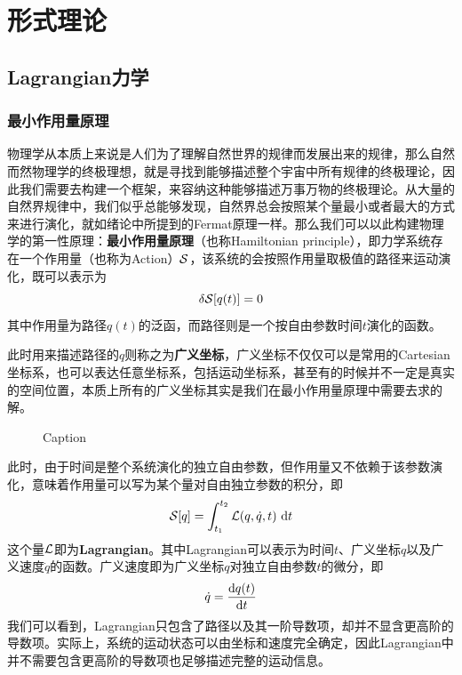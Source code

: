 \part{形式理论}
\chapter{Lagrangian力学}
\section{最小作用量原理}
\label{sec:princ_least_action}
物理学从本质上来说是人们为了理解自然世界的规律而发展出来的规律，那么自然而然物理学的终极理想，就是寻找到能够描述整个宇宙中所有规律的终极理论，因此我们需要去构建一个框架，来容纳这种能够描述万事万物的终极理论。从大量的自然界规律中，我们似乎总能够发现，自然界总会按照某个量最小或者最大的方式来进行演化，就如绪论中所提到的Fermat原理一样。那么我们可以以此构建物理学的第一性原理：\textbf{最小作用量原理}（也称Hamiltonian principle），即力学系统存在一个作用量（也称为Action）$\mathcal{S}$，该系统的会按照作用量取极值的路径来运动演化，既可以表示为
\begin{equation}
    \delta\mathcal{S}[q(t)] = 0\label{eq:1stprinciple}
\end{equation}
其中作用量为路径$q(t)$的泛函，而路径则是一个按自由参数时间$t$演化的函数。

此时用来描述路径的$q$则称之为\textbf{广义坐标}，广义坐标不仅仅可以是常用的Cartesian坐标系，也可以表达任意坐标系，包括运动坐标系，甚至有的时候并不一定是真实的空间位置，本质上所有的广义坐标其实是我们在最小作用量原理中需要去求的解。

\begin{figure}[h]
    \centering
    
    \caption{Caption}
    \label{fig:path}
\end{figure}

此时，由于时间是整个系统演化的独立自由参数，但作用量又不依赖于该参数演化，意味着作用量可以写为某个量对自由独立参数的积分，即
\begin{equation}
     \mathcal{S} [q]=  \int_{t_1} ^{t_2} \mathcal{L}(q,\dot{q},t) ~\mathrm{d} t 
\end{equation}
这个量$\mathcal{L}$即为\textbf{Lagrangian}。其中Lagrangian可以表示为时间$t$、广义坐标$q$以及广义速度$\dot{q}$的函数。广义速度即为广义坐标$q$对独立自由参数$t$的微分，即
\begin{equation}
    \dot{q} = \frac{\mathrm{d} q(t)}{\mathrm{d} t}
\end{equation}
我们可以看到，Lagrangian只包含了路径以及其一阶导数项，却并不显含更高阶的导数项。实际上，系统的运动状态可以由坐标和速度完全确定，因此Lagrangian中并不需要包含更高阶的导数项也足够描述完整的运动信息。

